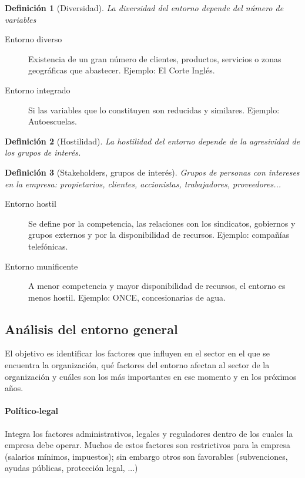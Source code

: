 \documentclass[12pt]{article}
\theoremstyle{definition_wo_parentheses}
\newtheorem{definicion}{Definición}[section]
\begin{document}
\begin{definicion}[Diversidad]
La diversidad del entorno depende del número de variables
\end{definicion}

\begin{description}
\item[Entorno diverso] Existencia de un gran número de clientes, productos, servicios o zonas geográficas que abastecer. Ejemplo: El Corte Inglés.
\item[Entorno integrado] Si las variables que lo constituyen son reducidas y similares. Ejemplo: Autoescuelas.
\end{description}



\begin{definicion}[Hostilidad]
La hostilidad del entorno depende de la agresividad de los grupos de interés.
\end{definicion}

\begin{definicion}[Stakeholders, grupos de interés]
Grupos de personas con intereses en la empresa: propietarios, clientes, accionistas, trabajadores, proveedores...
\end{definicion}

\begin{description}
\item[Entorno hostil] Se define por la competencia, las relaciones con los sindicatos, gobiernos y grupos externos y por la disponibilidad de recursos. Ejemplo: compañías telefónicas.
\item[Entorno munificente] A menor competencia y mayor disponibilidad de recursos, el entorno es menos hostil. Ejemplo: ONCE, concesionarias de agua.
\end{description}

\subsection{Análisis del entorno general}

El objetivo es identificar los factores que influyen en el sector en el que se encuentra la organización, qué factores del entorno afectan al sector de la organización y cuáles son los más importantes en ese momento y en los próximos años.

\paragraph{Político-legal} Integra los factores administrativos, legales y reguladores dentro de los cuales la empresa debe operar. Muchos de estos factores son restrictivos para la empresa (salarios mínimos, impuestos); sin embargo otros son favorables (subvenciones, ayudas públicas, protección legal, ...)
\end{document}
